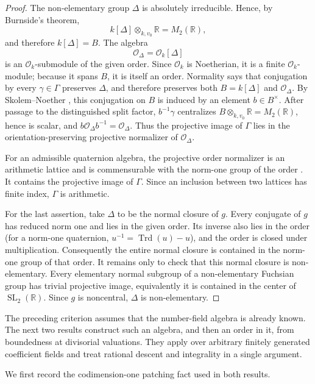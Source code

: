 \documentclass[11pt,reqno]{amsart}
\theoremstyle{definition}
\theoremstyle{remark}
\newcommand{\R}{\mathbb R}
\newcommand{\cO}{\mathcal O}
\newcommand{\Trd}{\operatorname{Trd}}
\newcommand{\SL}{\operatorname{SL}}
\begin{document}
\begin{proof}
The non-elementary group \(\Delta\) is absolutely irreducible.  Hence, by
Burnside's theorem,
\[
 k[\Delta]\otimes_{k,v_0}\R=M_2(\R),
\]
and therefore \(k[\Delta]=B\).  The algebra
\[
 \cO_\Delta=\cO_k[\Delta]
\]
is an \(\cO_k\)-submodule of the given order.  Since \(\cO_k\) is
Noetherian, it is a finite \(\cO_k\)-module; because it spans \(B\), it is
itself an order.  Normality says that conjugation by
every \(\gamma\in\Gamma\) preserves \(\Delta\), and therefore preserves both
\(B=k[\Delta]\) and \(\cO_\Delta\).  By Skolem--Noether
\cite[Section~12.6]{Pierce}, this conjugation on
\(B\) is induced by an element \(b\in B^\times\).  After passage to the
distinguished split factor, \(b^{-1}\gamma\) centralizes
\(B\otimes_{k,v_0}\R=M_2(\R)\), hence is scalar, and
\(b\cO_\Delta b^{-1}=\cO_\Delta\).  Thus the projective image of \(\Gamma\)
lies in the orientation-preserving projective normalizer of
\(\cO_\Delta\).

For an admissible quaternion algebra, the projective order normalizer is an
arithmetic lattice and is commensurable with the norm-one group of the order
\cite[Chapter~8]{MaclachlanReid}.
It contains the projective image of \(\Gamma\).  Since an inclusion between
two lattices has finite index, \(\Gamma\) is arithmetic.

For the last assertion, take \(\Delta\) to be the normal closure of \(g\).
Every conjugate of \(g\) has reduced norm one and lies in the given order.
Its inverse also lies in the order (for a norm-one quaternion,
\(u^{-1}=\Trd(u)-u\)), and the order is closed under multiplication.
Consequently the entire normal closure is contained in the norm-one group of
that order.  It remains only to check that this normal closure is
non-elementary.
Every elementary normal subgroup of a non-elementary Fuchsian group has
trivial projective image, equivalently it is contained in the center of
\(\SL_2(\R)\).  Since \(g\) is noncentral, \(\Delta\) is non-elementary.
\end{proof}

The preceding criterion assumes that the number-field algebra is already
known.  The next two results construct such an algebra, and then an order in
it, from boundedness at divisorial valuations.  They apply over arbitrary
finitely generated coefficient fields and treat rational descent and
integrality in a single argument.

We first record the codimension-one patching fact used in both results.
\end{document}
